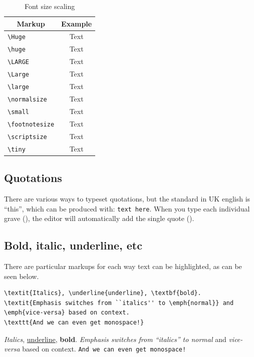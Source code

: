 \begin{table}[h]
\centering
\begin{tabular}{cc}
    Markup        & Example            \\ \hline
    \verb|\Huge        | &{\Huge Text}        \\
    \verb|\huge        | &{\huge Text}        \\
    \verb|\LARGE       | &{\LARGE Text}       \\
    \verb|\Large       | &{\Large Text}       \\
    \verb|\large       | &{\large Text}       \\
    \verb|\normalsize  | &{\normalsize Text}  \\
    \verb|\small       | &{\small Text}       \\
    \verb|\footnotesize| &{\footnotesize Text}\\
    \verb|\scriptsize  | &{\scriptsize Text}  \\
    \verb|\tiny        | &{\tiny Text}        
\end{tabular}
\label{tb:font-sizes}
\caption{Font size scaling}
\end{table}

\subsection{Quotations}
There are various ways to typeset quotations, but the standard in UK english is ``this'', which can be produced with: \texttt{\textasciigrave\textasciigrave text here\textquotesingle\textquotesingle}.
When you type each individual grave (\textasciigrave), the editor will automatically add the single quote (\textquotesingle).

\subsection{Bold, italic, underline, etc}
There are particular markups for each way text can be highlighted, as can be seen below. 

\begin{lstlisting}
\textit{Italics}, \underline{underline}, \textbf{bold}.
\textit{Emphasis switches from ``italics'' to \emph{normal}} and \emph{vice-versa} based on context.
\texttt{And we can even get monospace!}
\end{lstlisting}
\textit{Italics}, \underline{underline}, \textbf{bold}.
\textit{Emphasis switches from ``italics'' to \emph{normal}} and \emph{vice-versa} based on context.
\texttt{And we can even get monospace!}\\

